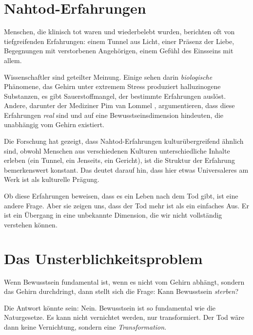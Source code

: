 \section{Nahtod-Erfahrungen}

Menschen, die klinisch tot waren und wiederbelebt wurden, berichten oft von tiefgreifenden Erfahrungen: einem Tunnel aus Licht, einer Präsenz der Liebe, Begegnungen mit verstorbenen Angehörigen, einem Gefühl des Einsseins mit allem.

Wissenschaftler sind geteilter Meinung. Einige sehen darin \emph{biologische} Phänomene, das Gehirn unter extremem Stress produziert halluzinogene Substanzen, es gibt Sauerstoffmangel, der bestimmte Erfahrungen auslöst. Andere, darunter der Mediziner Pim van Lommel \cite{vanLommel2001}, argumentieren, dass diese Erfahrungen \emph{real} sind und auf eine Bewusstseinsdimension hindeuten, die unabhängig vom Gehirn existiert.

Die Forschung hat gezeigt, dass Nahtod-Erfahrungen kulturübergreifend ähnlich sind, obwohl Menschen aus verschiedenen Kulturen unterschiedliche \glqq Inhalte\grqq{} erleben (ein Tunnel, ein Jenseits, ein Gericht), ist die Struktur der Erfahrung bemerkenswert konstant. Das deutet darauf hin, dass hier etwas Universaleres am Werk ist als kulturelle Prägung.

Ob diese Erfahrungen \glqq beweisen\grqq{}, dass es ein Leben nach dem Tod gibt, ist eine andere Frage. Aber sie zeigen uns, dass der Tod mehr ist als ein einfaches \glqq Aus\grqq{}. Er ist ein Übergang in eine unbekannte Dimension, die wir nicht vollständig verstehen können.

\section{Das Unsterblichkeitsproblem}

Wenn Bewusstsein fundamental ist, wenn es nicht vom Gehirn abhängt, sondern das Gehirn durchdringt, dann stellt sich die Frage: Kann Bewusstsein \emph{sterben}?

Die Antwort könnte sein: Nein. Bewusstsein ist so fundamental wie die Naturgesetze. Es kann nicht vernichtet werden, nur transformiert. Der Tod wäre dann keine Vernichtung, sondern eine \emph{Transformation}.

